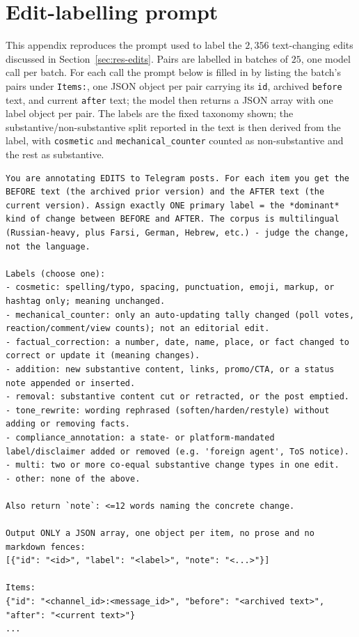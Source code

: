 \chapter{Edit-labelling prompt}
\label{app:edit-prompt}

This appendix reproduces the prompt used to label the $2{,}356$ text-changing edits discussed in Section~\ref{sec:res-edits}. Pairs are labelled in batches of $25$, one model call per batch. For each call the prompt below is filled in by listing the batch's pairs under \texttt{Items:}, one JSON object per pair carrying its \texttt{id}, archived \texttt{before} text, and current \texttt{after} text; the model then returns a JSON array with one label object per pair. The labels are the fixed taxonomy shown; the substantive/non-substantive split reported in the text is then derived from the label, with \texttt{cosmetic} and \texttt{mechanical\_counter} counted as non-substantive and the rest as substantive.

\begin{lstlisting}[numbers=none,caption={Edit-type labelling prompt, as sent to Claude Sonnet~4.6.},captionpos=b,label={lst:edit-prompt}]
You are annotating EDITS to Telegram posts. For each item you get the BEFORE text (the archived prior version) and the AFTER text (the current version). Assign exactly ONE primary label = the *dominant* kind of change between BEFORE and AFTER. The corpus is multilingual (Russian-heavy, plus Farsi, German, Hebrew, etc.) - judge the change, not the language.

Labels (choose one):
- cosmetic: spelling/typo, spacing, punctuation, emoji, markup, or hashtag only; meaning unchanged.
- mechanical_counter: only an auto-updating tally changed (poll votes, reaction/comment/view counts); not an editorial edit.
- factual_correction: a number, date, name, place, or fact changed to correct or update it (meaning changes).
- addition: new substantive content, links, promo/CTA, or a status note appended or inserted.
- removal: substantive content cut or retracted, or the post emptied.
- tone_rewrite: wording rephrased (soften/harden/restyle) without adding or removing facts.
- compliance_annotation: a state- or platform-mandated label/disclaimer added or removed (e.g. 'foreign agent', ToS notice).
- multi: two or more co-equal substantive change types in one edit.
- other: none of the above.

Also return `note`: <=12 words naming the concrete change.

Output ONLY a JSON array, one object per item, no prose and no markdown fences:
[{"id": "<id>", "label": "<label>", "note": "<...>"}]

Items:
{"id": "<channel_id>:<message_id>", "before": "<archived text>", "after": "<current text>"}
...
\end{lstlisting}
